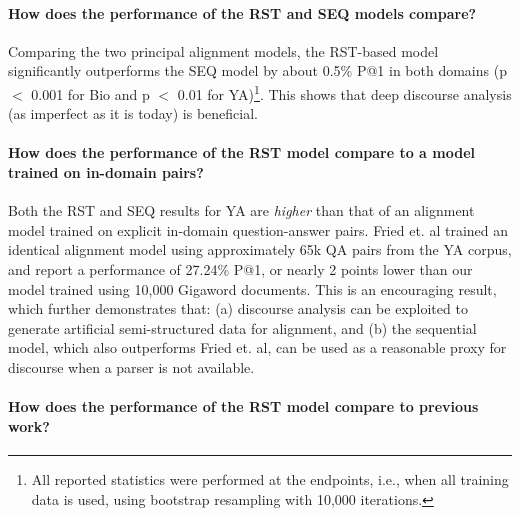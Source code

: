 \paragraph{How does the performance of the RST and SEQ models compare?}
Comparing the two principal alignment models, the RST-based model significantly outperforms the SEQ model by about 0.5\% P@1 in both domains (p $<$ 0.001 for Bio and p $<$ 0.01 for YA)\footnote{All reported statistics were performed at the endpoints, i.e., when all training data is used, using bootstrap resampling with 10,000 iterations.}. This shows that deep discourse analysis (as imperfect as it is today) is beneficial. 

\paragraph{How does the performance of the RST model compare to a model trained on in-domain pairs?}

Both the RST and SEQ results for YA are {\em higher} than that of an alignment model trained on explicit in-domain question-answer pairs. Fried et. al \citeyear{fried2015higher} trained an identical alignment model using approximately 65k QA pairs from the YA corpus, and report a performance of 27.24\% P@1, or nearly 2 points lower than our model trained using 10,000 Gigaword documents. This is an encouraging result, which further demonstrates that: (a) discourse analysis can be exploited to generate artificial semi-structured data for alignment, and (b) the sequential model, which also outperforms Fried et. al, can be used as a reasonable proxy for discourse when a parser is not available. 


\paragraph{How does the performance of the RST model compare to previous work?}

